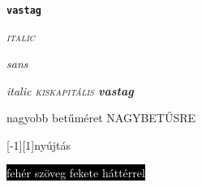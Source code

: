 \documentclass[]{article}
\begin{document}
\texttt{\textbf{vastag}}

\textsc{\textit{italic}}

\textsl{\textsf{sans}}

\emph{\textit{italic} \emph{\textsc{kiskapitális}
\emph{\textbf{vastag}}}}

\huge nagyobb betűméret \normalsize
\MakeUppercase{Nagybetűsre}


\scalebox{1}[-1]{\scalebox{2.0}[1]{nyújtás}}



\colorbox{black}{\textcolor{white}{fehér szöveg fekete háttérrel}}

\textcolor{red}{}
\end{document}
